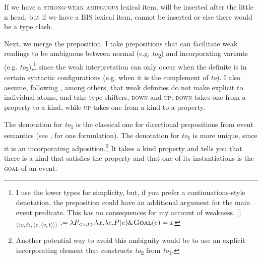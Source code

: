 \documentclass[output=paper,
modfonts
]{langscibook}
\begin{document}
If we have a \textsc{strong-weak ambiguous} lexical item,  will be inserted after the little n head, but if we have a BIS lexical item,  cannot be inserted or else there would be a type clash. 

Next, we merge the preposition. I take prepositions that can facilitate weak readings  to be ambiguous between normal (e.g. \textit{to}\textsubscript{2}) and incorporating variants (e.g. \textit{to}\textsubscript{2}),\footnote{I use the lower types for simplicity, but, if you prefer a continuations-style denotation, the preposition could have an additional argument for the main event predicate. This has no consequences for my account of weakness.
\ea \textnormal{[\!]\textsubscript{$\langle \langle v,t \rangle,\langle e,\langle v,t\rangle \rangle \rangle$} $:= \lambda P_{<v,t>} \lambda x. \lambda e.P(e) \& \textsc{Goal}(e)=x $}
\z\vspace*{-\baselineskip}} since the weak interpretation can only occur when the definite is in certain syntactic configurations (e.g. when it is the complement of \textit{to}). I also assume, following \citet{Aguilar-Guevara2014}, among others, that weak definites do not make explicit  to individual atoms, and take  type-shifters, \textsc{down} and \textsc{up}; \textsc{down} takes one from a property to a kind, while \textsc{up} takes one from a kind to a property. 

\begin{exe} 
\end{exe}

The denotation for \textit{to}\textsubscript{1} is the classical one for directional prepositions from event semantics (see \citealt[57]{Champollion2017}, for one formulation). The denotation for \textit{to}\textsubscript{1} is more unique, since it is an incorporating adposition.\footnote{Another potential way to avoid this ambiguity would be to use an explicit incorporating element that constructs \textit{to}\textsubscript{2} from \textit{to}\textsubscript{1}.} It takes a kind property and tells you that there is a kind that satisfies the property and that one of its instantiations is the \textsc{goal} of an event.
\end{document}
